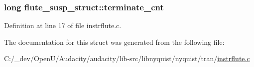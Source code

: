 \subsubsection[{\texorpdfstring{terminate\+\_\+cnt}{terminate_cnt}}]{\setlength{\rightskip}{0pt plus 5cm}long flute\+\_\+susp\+\_\+struct\+::terminate\+\_\+cnt}\hypertarget{structflute__susp__struct_a6331f9bfa0d2a68927b5856808a527bc}{}\label{structflute__susp__struct_a6331f9bfa0d2a68927b5856808a527bc}


Definition at line 17 of file instrflute.\+c.



The documentation for this struct was generated from the following file\+:\begin{DoxyCompactItemize}
\item 
C\+:/\+\_\+dev/\+Open\+U/\+Audacity/audacity/lib-\/src/libnyquist/nyquist/tran/\hyperlink{instrflute_8c}{instrflute.\+c}\end{DoxyCompactItemize}
